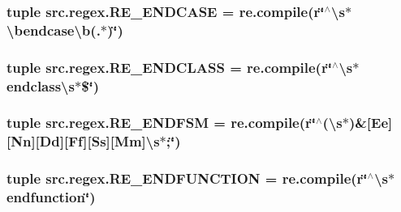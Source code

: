 \hypertarget{namespacesrc_1_1regex_a3eadb320c0e007f250e95fd27d29eee7}{
\subsubsection[{R\-E\-\_\-\-E\-N\-D\-C\-A\-S\-E}]{\setlength{\rightskip}{0pt plus 5cm}tuple src.\-regex.\-R\-E\-\_\-\-E\-N\-D\-C\-A\-S\-E = re.\-compile(r\char`\"{}$^\wedge$\textbackslash{}s$\ast$\textbackslash{}bendcase\textbackslash{}b(.$\ast$)\char`\"{})}}\label{namespacesrc_1_1regex_a3eadb320c0e007f250e95fd27d29eee7}
\hypertarget{namespacesrc_1_1regex_a76f5288ee51a094469709268ab9a56f0}{
\subsubsection[{R\-E\-\_\-\-E\-N\-D\-C\-L\-A\-S\-S}]{\setlength{\rightskip}{0pt plus 5cm}tuple src.\-regex.\-R\-E\-\_\-\-E\-N\-D\-C\-L\-A\-S\-S = re.\-compile(r\char`\"{}$^\wedge$\textbackslash{}s$\ast$endclass\textbackslash{}s$\ast$\$\char`\"{})}}\label{namespacesrc_1_1regex_a76f5288ee51a094469709268ab9a56f0}
\hypertarget{namespacesrc_1_1regex_af199feb6d584969abe571c3978a0e920}{
\subsubsection[{R\-E\-\_\-\-E\-N\-D\-F\-S\-M}]{\setlength{\rightskip}{0pt plus 5cm}tuple src.\-regex.\-R\-E\-\_\-\-E\-N\-D\-F\-S\-M = re.\-compile(r\char`\"{}$^\wedge$(\textbackslash{}s$\ast$)\&\mbox{[}Ee\mbox{]}\mbox{[}Nn\mbox{]}\mbox{[}Dd\mbox{]}\mbox{[}Ff\mbox{]}\mbox{[}Ss\mbox{]}\mbox{[}Mm\mbox{]}\textbackslash{}s$\ast$;\char`\"{})}}\label{namespacesrc_1_1regex_af199feb6d584969abe571c3978a0e920}
\hypertarget{namespacesrc_1_1regex_a6ef4de9bb7a113c76162ac09959df60c}{
\subsubsection[{R\-E\-\_\-\-E\-N\-D\-F\-U\-N\-C\-T\-I\-O\-N}]{\setlength{\rightskip}{0pt plus 5cm}tuple src.\-regex.\-R\-E\-\_\-\-E\-N\-D\-F\-U\-N\-C\-T\-I\-O\-N = re.\-compile(r\char`\"{}$^\wedge$\textbackslash{}s$\ast$endfunction\char`\"{})}}\label{namespacesrc_1_1regex_a6ef4de9bb7a113c76162ac09959df60c}
